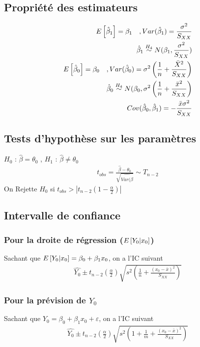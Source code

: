 \documentclass[10pt, french]{article}
\begin{document}
\begin{multicols*}{3}
\subsection*{Propriété des estimateurs}
\begin{align*}
E \left[ \hat{\beta}_1 \right] = \beta_1 \quad , Var(\hat{\beta}_1) = \frac{\sigma^2}{S_{XX}} \\
\hat{\beta}_1 \overset{H_4}{\sim} N(\beta_1, \frac{\sigma^2}{S_{XX}}) \\
E \left[ \hat{\beta}_0 \right] = \beta_0 \quad , Var(\hat{\beta}_0) = \sigma^2 \left( \frac{1}{n} + \frac{\bar{X}^2}{S_{XX}} \right) \\
\hat{\beta}_0 \overset{H_4}{\sim} N(\beta_0, \sigma^2 \left( \frac{1}{n}  + \frac{\bar{x}^2}{S_{XX}} \right) \\
Cov(\hat{\beta}_0, \hat{\beta}_1) = - \frac{\bar{x} \sigma^2}{S_{XX}}
\end{align*}

\subsection*{Tests d'hypothèse sur les paramètres}
$H_0$ : $\hat{\beta} = \theta_0$ , $H_1$ : $\hat{\beta} \neq \theta_0$
\begin{align*}
t_{obs} = \frac{\hat{\beta} - \theta_0}{\sqrt{\hat{Var(\hat{\beta}}}} \sim T_{n-2}
\end{align*}
On Rejette $H_0$ si $t_{obs} > | t_{n-2} (1 - \frac{\alpha}{2})|$

\subsection*{Intervalle de confiance}
\subsubsection*{Pour la droite de régression ($E \left[ Y_0|x_0 \right]$)}
Sachant que $E \left[ Y_0 | x_0 \right] = \beta_0 + \beta_1 x_0$, on a l'IC suivant
\begin{align*}
\hat{Y_0} \pm t_{n-2} \left(\frac{\alpha}{2} \right) \sqrt{s^2 \left( \frac{1}{n} + \frac{(x_0 - \bar{x})^2}{S_{XX}} \right)}
\end{align*}

\subsubsection*{Pour la prévision de $Y_0$}
Sachant que $Y_0 = \beta_0 + \beta_1 x_0 + \varepsilon$, on a l'IC suivant
\begin{align*}
\hat{Y_0} \pm t_{n-2} \left(\frac{\alpha}{2} \right) \sqrt{s^2 \left( 1 + \frac{1}{m} + \frac{(x_0 - \bar{x})^2}{S_{XX}} \right)}
\end{align*}


\end{multicols*}
\end{document}
